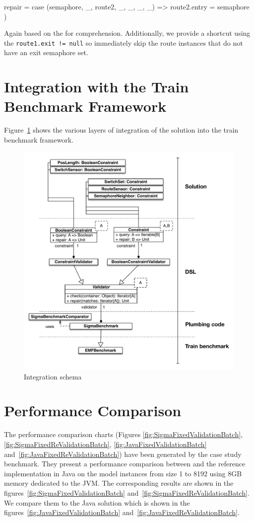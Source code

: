 \begin{itemize}[---]
\begin{scalacode}
    repair = {
      case (semaphore, _, route2, _, _, _, _) => route2.entry = semaphore
    }
  )
  \end{scalacode}
  Again based on the for comprehension.
  Additionally, we provide a shortcut using the \texttt{route1.exit != null} so immediately skip the route instances that do not have an exit semaphore set. 

\end{itemize}

\section{Integration with the Train Benchmark Framework}
\label{sec:SchemaIntegration}

Figure~\ref{fig:IntegartionSchema} shows the various layers of integration of the solution into the train benchmark framework.

\begin{figure}[h!tb]
  \centering
  \includegraphics[width=.7\textwidth]{figures/integration.pdf}
  \caption{Integration schema}
  \label{fig:IntegartionSchema}
\end{figure}


\section{Performance Comparison}
\label{sec:PerformanceComparison}

The performance comparison charts (\Cf Figures \ref{fig:SigmaFixedValidationBatch}, \ref{fig:SigmaFixedReValidationBatch}, \ref{fig:JavaFixedValidationBatch} and~\ref{fig:JavaFixedReValidationBatch}) have been generated by the case study benchmark.
They present a performance comparison between \SIGMA and the reference implementation in Java on the model instances from size 1 to 8192 using 8GB memory dedicated to the JVM.
The corresponding results are shown in the figures~\ref{fig:SigmaFixedValidationBatch} and~\ref{fig:SigmaFixedReValidationBatch}.
We compare them to the Java solution which is shown in the figures~\ref{fig:JavaFixedValidationBatch} and~\ref{fig:JavaFixedReValidationBatch}.

